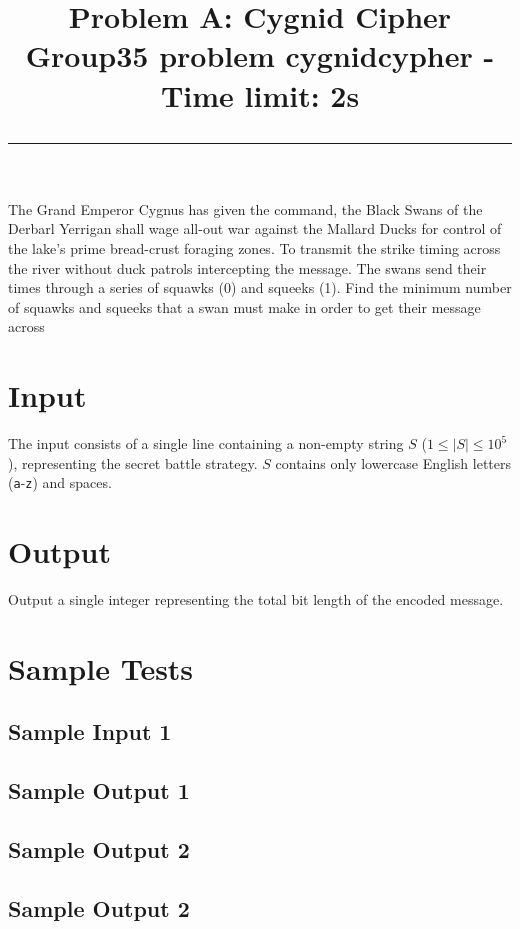 \documentclass{article}
\title{\flushleft\textbf{Problem A: Cygnid Cipher} \\[1.0em] \small Group35 problem \textbf{cygnidcypher} - Time limit: 2s \noindent\rule{\textwidth}{0.4pt}}
\date{}
\begin{document}
\maketitle
\vspace{-90pt}
\section*{}
The Grand Emperor Cygnus has given the command, the Black Swans of the Derbarl Yerrigan shall wage all-out war against the Mallard Ducks for control of the lake's prime bread-crust foraging zones.
To transmit the strike timing across the river without duck patrols intercepting the message. The swans send their times through a series of squawks (0) and squeeks (1).
Find the minimum number of squawks and squeeks that a swan must make in order to get their message across

\section*{Input}
The input consists of a single line containing a non-empty string $S$ ($1 \le |S| \le 10^5$), representing the secret battle strategy. $S$ contains only lowercase English letters (\texttt{a}-\texttt{z}) and spaces.

\section*{Output}
Output a single integer representing the total bit length of the encoded message.

\section*{Sample Tests}

\subsection*{Sample Input 1}

\subsection*{Sample Output 1}


\subsection*{Sample Output 2}

\subsection*{Sample Output 2}
\end{document}
